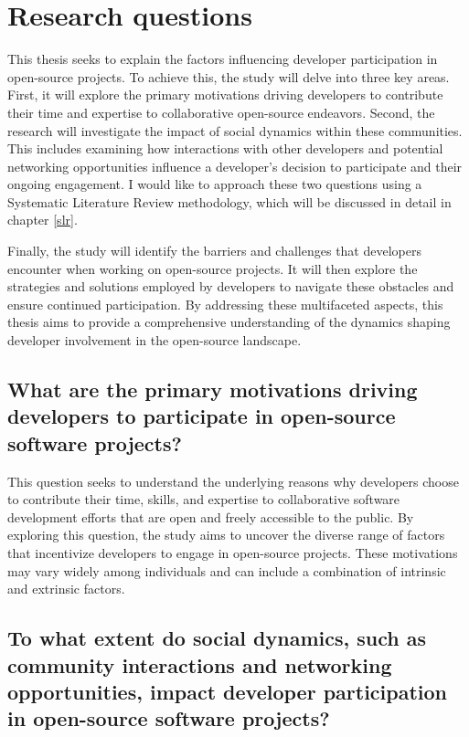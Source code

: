 \section{Research questions} \label{researchQuestions}
This thesis seeks to explain the factors influencing developer participation in open-source projects. To achieve this, the study will delve into three key areas. First, it will explore the primary motivations driving developers to contribute their time and expertise to collaborative open-source endeavors.  Second, the research will investigate the impact of social dynamics within these communities. This includes examining how interactions with other developers and potential networking opportunities influence a developer's decision to participate and their ongoing engagement. I would like to approach these two questions using a Systematic Literature Review methodology, which will be discussed in detail in chapter \ref{slr}.

Finally, the study will identify the barriers and challenges that developers encounter when working on open-source projects. It will then explore the strategies and solutions employed by developers to navigate these obstacles and ensure continued participation. By addressing these multifaceted aspects, this thesis aims to provide a comprehensive understanding of the dynamics shaping developer involvement in the open-source landscape. 


\subsection{What are the primary motivations driving developers to participate in open-source software projects?}

This question seeks to understand the underlying reasons why developers choose to contribute their time, skills, and expertise to collaborative software development efforts that are open and freely accessible to the public. By exploring this question, the study aims to uncover the diverse range of factors that incentivize developers to engage in open-source projects. These motivations may vary widely among individuals and can include a combination of intrinsic and extrinsic factors.

\subsection{To what extent do social dynamics, such as community interactions and networking opportunities, impact developer participation in open-source software projects?}

